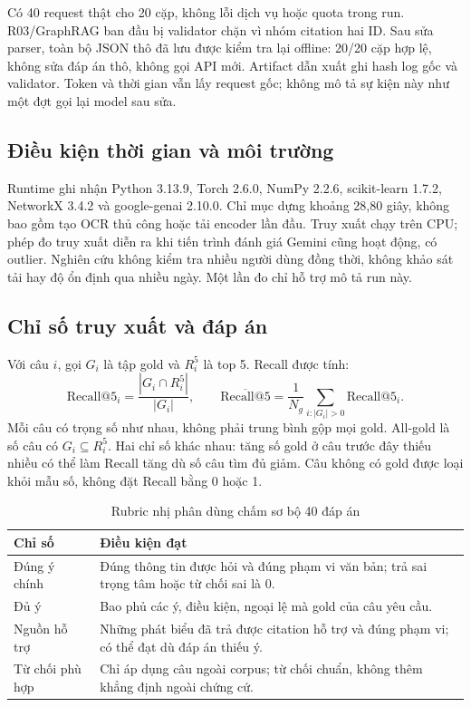 Có 40 request thật cho 20 cặp, không lỗi dịch vụ hoặc quota trong run. R03/GraphRAG ban đầu bị validator chặn vì nhóm citation hai ID. Sau sửa parser, toàn bộ JSON thô đã lưu được kiểm tra lại offline: 20/20 cặp hợp lệ, không sửa đáp án thô, không gọi API mới. Artifact dẫn xuất ghi hash log gốc và validator. Token và thời gian vẫn lấy request gốc; không mô tả sự kiện này như một đợt gọi lại model sau sửa.

\subsection{Điều kiện thời gian và môi trường}
Runtime ghi nhận Python 3.13.9, Torch 2.6.0, NumPy 2.2.6, scikit-learn 1.7.2, NetworkX 3.4.2 và google-genai 2.10.0. Chỉ mục dựng khoảng 28,80 giây, không bao gồm tạo OCR thủ công hoặc tải encoder lần đầu. Truy xuất chạy trên CPU; phép đo truy xuất diễn ra khi tiến trình đánh giá Gemini cũng hoạt động, có outlier. Nghiên cứu không kiểm tra nhiều người dùng đồng thời, không khảo sát tải hay độ ổn định qua nhiều ngày. Một lần đo chỉ hỗ trợ mô tả run này.

\subsection{Chỉ số truy xuất và đáp án}
Với câu $i$, gọi $G_i$ là tập gold và $R_i^5$ là top 5. Recall được tính:
\begin{equation}
 \mathrm{Recall@5}_i=\frac{|G_i\cap R_i^5|}{|G_i|},\qquad
 \overline{\mathrm{Recall@5}}=\frac{1}{N_g}\sum_{i:|G_i|>0}\mathrm{Recall@5}_i.
\end{equation}
Mỗi câu có trọng số như nhau, không phải trung bình gộp mọi gold. All-gold là số câu có $G_i\subseteq R_i^5$. Hai chỉ số khác nhau: tăng số gold ở câu trước đây thiếu nhiều có thể làm Recall tăng dù số câu tìm đủ giảm. Câu không có gold được loại khỏi mẫu số, không đặt Recall bằng 0 hoặc 1.

\begin{table}[H]
\centering\small
\caption{Rubric nhị phân dùng chấm sơ bộ 40 đáp án}
\begin{tabularx}{\textwidth}{l X}
\toprule Chỉ số & Điều kiện đạt\\
\midrule
Đúng ý chính & Đúng thông tin được hỏi và đúng phạm vi văn bản; trả sai trọng tâm hoặc từ chối sai là 0.\\
Đủ ý & Bao phủ các ý, điều kiện, ngoại lệ mà gold của câu yêu cầu.\\
Nguồn hỗ trợ & Những phát biểu đã trả được citation hỗ trợ và đúng phạm vi; có thể đạt dù đáp án thiếu ý.\\
Từ chối phù hợp & Chỉ áp dụng câu ngoài corpus; từ chối chuẩn, không thêm khẳng định ngoài chứng cứ.\\
\bottomrule
\end{tabularx}
\end{table}

